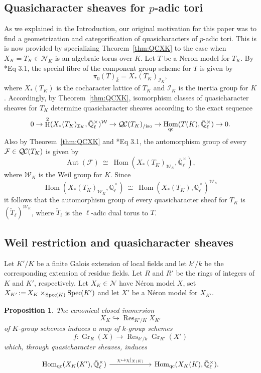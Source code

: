 \documentclass[CM,Submssn,SecEq]{degruyter-crelle} %
\theoremstyle{plain}
\newtheorem{proposition}[theorem]{Proposition}
\theoremstyle{definition}
\theoremstyle{remark}
\newcommand{\EE}{\mathbb{\bar Q}_\ell}
\newcommand{\bFq}{\bar{k}}
\newcommand{\Fq}{k}
\newcommand{\EEx}{\EE^\times}
\newcommand{\Weil}[1]{\mathcal{W}_{#1}}
\DeclareMathOperator{\Aut}{Aut}
\DeclareMathOperator{\Hom}{Hom}
\DeclareMathOperator{\Gr}{Gr}
\DeclareMathOperator{\Hh}{H}
\DeclareMathOperator{\Res}{Res}
\newcommand{\Spec}[1]{{\operatorname{Spec}\hskip-1pt( #1 )}}
\newcommand{\ceq}{{\, :=\, }}
\newcommand{\iso}{{\ \cong\ }}
\newcommand{\qcs}[1]{{\mathcal{#1}}}
\newcommand{\QC}{{\mathcal{Q\hskip-0.8pt C}}}
\newcommand{\QCiso}[1]{\QC(#1)_{/\text{iso}}}
\begin{document}
\subsection{Quasicharacter sheaves for $p$-adic tori} \label{ssec:qc_tori}

As we explained in the Introduction, our original motivation for this paper was to find a geometrization and categorification of quasicharacters of $p$-adic tori. 
This is is now provided by specializing Theorem~\ref{thm:QCXK} to the case when $X_K= T_K\in \mathcal{N}_K$ is an algebraic torus over $K$. 
Let $T$ be a Neron model for $T_K$.
By \cite{bitan:discriminant}*{Eq 3.1}, the special fibre of the component group scheme for $T$ is given by
\[
 \pi_0(T)_{\bFq} = X_*(T_K)_{\mathcal{I}_K},
\]
where $X_*(T_K)$ is the cocharacter lattice of $T_K$ and $\mathcal{I}_K$ is the inertia group for $K$.
Accordingly, by Theorem~\ref{thm:QCXK}, isomorphism classes of quasicharacter sheaves for $T_K$ determine quasicharacter sheaves according to the exact sequence
\[
0 \to \Hh^2(X_*(T_K)_{\mathcal{I}_K},\EEx)^{\Weil{}} \to \QCiso{T_K} \to \Hom_\text{qc}(T(K),\EEx) \to 0.
\]
Also by Theorem~\ref{thm:QCXK} and \cite{bitan:discriminant}*{Eq 3.1}, the automorphism group of every $\qcs{F} \in \QC(T_K)$ is given by 
\[
\Aut(\qcs{F}) \iso \Hom(X_*(T_K)_{\Weil{K}},\EEx),
\]
where $\Weil{K}$ is the Weil group for $K$. 
Since 
\[
\Hom(X_*(T_K)_{\Weil{K}},\EEx) \iso \Hom(X_*(T_K),\EEx)^{\Weil{K}}
\]
it follows that the automorphism group of every quasicharacter sheaf for $T_K$ is $(\check{T}_\ell)^{\Weil{K}}$, where $\check{T}_\ell$ is the $\ell$-adic dual torus to $T$.

\subsection{Weil restriction and quasicharacter sheaves}\label{ssec:wrK}

Let $K'/K$ be a finite Galois extension of local fields and
let $k'/k$ be the corresponding extension of residue fields.
Let $R$ and $R'$ be the rings of integers of $K$ and $K'$, respectively.
Let $X_K \in \mathcal{N}$ have N\'eron model $X$, set $X_{K'} \ceq X_K \times_\Spec{K} \Spec{K'}$
and let $X'$ be a N\'eron model for $X_{K'}$.

\begin{proposition}\label{prop:wrK}
The canonical closed immersion 
\[
X_K \hookrightarrow \Res_{K'/K} X_{K'}
\]
of $K$-group schemes
induces a map of $\Fq$-group schemes 
\[
f : \Gr_R(X) \to \Res_{k'/k} \Gr_{R'}(X')
\] 
which, through quasicharacter sheaves, induces
\[
\begin{tikzcd}[column sep=60]
\Hom_{\text{qc}}(X_K(K'), \EEx) \arrow{r}{\chi \mapsto \chi\vert_{X(K)}} &\Hom_{\text{qc}}(X_K(K), \EEx).
\end{tikzcd}
\]
\end{proposition}
\end{document}
